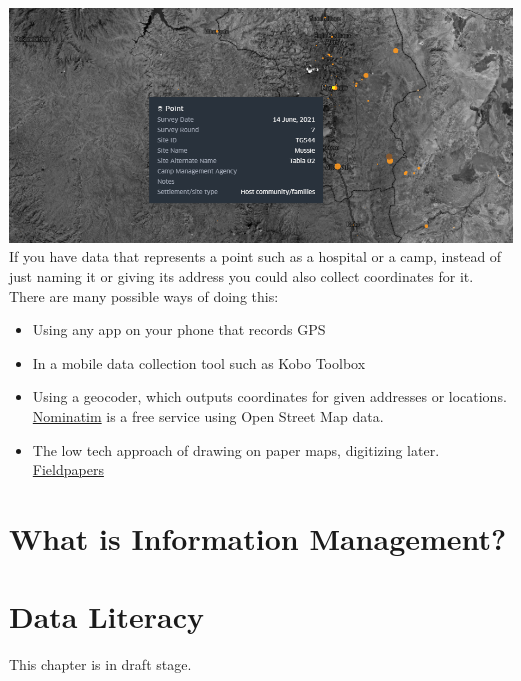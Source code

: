 \documentclass[
  a4paper,
  onecolumn,
  oneside]{book}
\begin{document}
\includegraphics{part1/./images/pointdata.png}\\
If you have data that represents a point such as a hospital or a camp,
instead of just naming it or giving its address you could also collect
coordinates for it. There are many possible ways of doing this:

\begin{itemize}
\item
  Using any app on your phone that records GPS
\item
  In a mobile data collection tool such as Kobo Toolbox
\item
  Using a geocoder, which outputs coordinates for given addresses or
  locations. \href{http://nominatim.openstreetmap.org/}{Nominatim} is a
  free service using Open Street Map data.
\item
  The low tech approach of drawing on paper maps, digitizing later.
  \href{is\%20a\%20good\%20tool\%20for\%20this}{Fieldpapers}
\end{itemize}

\hypertarget{what-is-information-management}{%
\chapter{What is Information
Management?}\label{what-is-information-management}}

\hypertarget{data-literacy-1}{%
\chapter{Data Literacy}\label{data-literacy-1}}

\begin{tcolorbox}[enhanced jigsaw, leftrule=.75mm, arc=.35mm, breakable, toprule=.15mm, opacitybacktitle=0.6, title=\textcolor{quarto-callout-warning-color}{\faExclamationTriangle}\hspace{0.5em}{Warning}, toptitle=1mm, colframe=quarto-callout-warning-color-frame, left=2mm, opacityback=0, rightrule=.15mm, colback=white, coltitle=black, bottomrule=.15mm, colbacktitle=quarto-callout-warning-color!10!white, bottomtitle=1mm, titlerule=0mm]

This chapter is in draft stage.

\end{tcolorbox}
\end{document}
